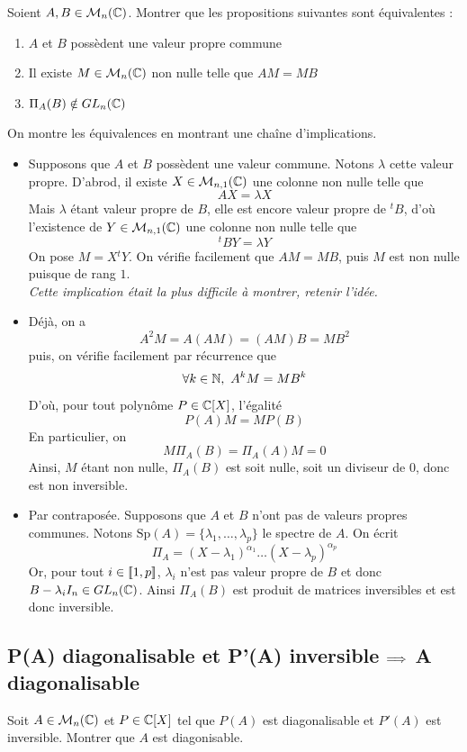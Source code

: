 \begin{exo}
	Soient $A,B\in\mathcal M_n(\mathbb{C})$. Montrer que les propositions suivantes sont équivalentes :
	\begin{enumerate}
		\item $A$ et $B$ possèdent une valeur propre commune
		\item Il existe $M\in\mathcal M_n(\mathbb{C})$ non nulle telle que $AM=MB$
		\item $\Pi_A(B)\notin GL_n(\mathbb{C})$
	\end{enumerate}
\end{exo}

\begin{sol}
	On montre les équivalences en montrant une chaîne d'implications.
	\begin{itemize}
		\item[\underline{1) $\implique$ 2)}] Supposons que $A$ et $B$ possèdent une valeur commune. Notons $\lambda$ cette valeur propre. D'abrod, il existe $X\in\mathcal M_{n,1}(\mathbb{C})$ une colonne non nulle telle que \[AX=\lambda X\]
		Mais $\lambda$ étant valeur propre de $B$, elle est encore valeur propre de ${}^tB$, d'où l'existence de $Y\in\mathcal M_{n,1}(\mathbb{C})$ une colonne non nulle telle que \[{}^tBY=\lambda Y\]
		On pose $M=X{}^tY$. On vérifie facilement que $AM=MB$, puis $M$ est non nulle puisque de rang $1$.\\


		\textit{Cette implication était la plus difficile à montrer, retenir l'idée.}
		\item[\underline{2) $\implique$ 3)}] Déjà, on a \[A^2M=A(AM)=(AM)B=MB^2\]
		puis, on vérifie facilement par récurrence que \[\forall k\in\mathbb{N},\ A^kM=MB^k\]
		D'où, pour tout polynôme $P\in\mathbb{C}[X]$, l'égalité \[P(A)M=MP(B)\]
		En particulier, on \[M\Pi_A(B)=\Pi_A(A)M=0\]
		Ainsi, $M$ étant non nulle, $\Pi_A(B)$ est soit nulle, soit un diviseur de $0$, donc est non inversible.
		\item[\underline{3) $\implique$ 1)}] Par contraposée. Supposons que $A$ et $B$ n'ont pas de valeurs propres communes. Notons $\text{Sp}(A)=\lbrace \lambda_1,\dots,\lambda_p\rbrace$ le spectre de $A$. On écrit \[\Pi_A=(X-\lambda_1)^{\alpha_1}\dots(X-\lambda_p)^{\alpha_p}\]
		Or, pour tout $i\in[\![1,p]\!]$, $\lambda_i$ n'est pas valeur propre de $B$ et donc $B-\lambda_iI_n\in GL_n(\mathbb{C})$. Ainsi $\Pi_A(B)$ est produit de matrices inversibles et est donc inversible.
	\end{itemize}
\end{sol}

\subsection{P(A) diagonalisable et P'(A) inversible $\implique$ A diagonalisable}
\begin{exo}
Soit $A\in\mathcal M_n(\mathbb{C})$ et $P\in\mathbb{C}[X]$ tel que $P(A)$ est diagonalisable et $P'(A)$ est inversible. Montrer que $A$ est diagonisable.
\end{exo}

